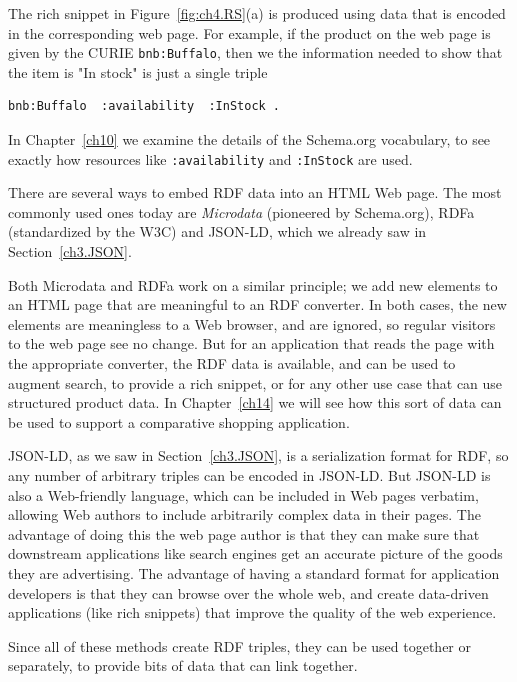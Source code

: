 The rich snippet in Figure~\ref{fig:ch4.RS}(a) is produced using data that is encoded in the corresponding 
web page.  For example, if the product on the web page is given by the CURIE \texttt{bnb:Buffalo},  
then we the information needed to show that the item is "In stock" is just 
a single triple

\begin{lstlisting}
bnb:Buffalo  :availability  :InStock .
\end{lstlisting}


In Chapter~\ref{ch10} we examine the details of the Schema.org vocabulary, to 
see exactly how  resources like \texttt{:availability} and \texttt{:InStock} are used. 

There are several ways to embed RDF data into an HTML Web page.  The most commonly used ones
today are \emph{Microdata} (pioneered by Schema.org), RDFa (standardized by the W3C)
and JSON-LD, which we already saw in Section~\ref{ch3.JSON}. 

Both Microdata and RDFa work on a similar principle; we add new elements to an 
HTML page that are meaningful to an RDF converter.  In both cases, the new elements
are meaningless to a Web browser, and are ignored, so regular visitors to the
web page see no change.  But for an application that reads the page with the appropriate
converter, the RDF data is available, and can be used to augment search, to provide
a rich snippet, or for any other use case that can use structured product data.  In 
Chapter~\ref{ch14} we will see how this sort of data can be used to support a comparative
shopping application. 

JSON-LD, as we saw in Section~\ref{ch3.JSON}, is a serialization format for RDF, so 
any number of arbitrary triples can be encoded in JSON-LD.  But JSON-LD is also 
a Web-friendly language, which can be included in Web pages verbatim, allowing Web
authors to include arbitrarily complex data in their pages. The advantage of doing this 
the web page author is that they can make sure that downstream applications
like search engines get an accurate picture of the goods they are advertising. 
The advantage of having a standard format for application developers is that they 
can browse over the whole web, and create data-driven applications (like rich snippets)
that improve the quality of the web experience. 

Since all of these methods create RDF triples, they can be used together or 
separately, to provide bits of data that can link together. 


